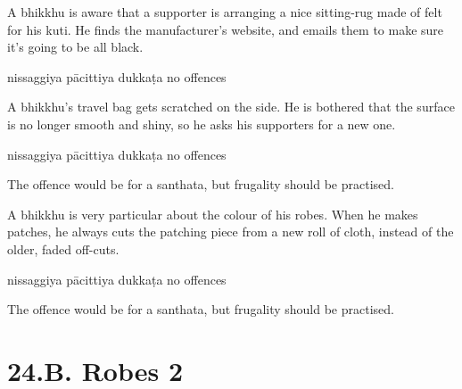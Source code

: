 \begin{exam}{\autoExamName}
\begin{problem*}
\begin{parts}
      \bigskip

      \item A bhikkhu is aware that a supporter is arranging a nice sitting-rug
      made of felt for his kuti. He finds the manufacturer's website, and emails
      them to make sure it's going to be all black.

      \bigskip

      \begin{answers}{3}
        \bChoices
         nissaggiya pācittiya\eAns
         dukkaṭa\eAns
         no offences\eAns
        \eChoices
      \end{answers}

      \bigskip

      \item A bhikkhu's travel bag gets scratched on the side. He is bothered
      that the surface is no longer smooth and shiny, so he asks his supporters
      for a new one.

      \bigskip

      \begin{answers}{3}
        \bChoices
         nissaggiya pācittiya\eAns
         dukkaṭa\eAns
         no offences\eAns
        \eChoices
      \end{answers}

      \begin{solution}
        The offence would be for a santhata, but frugality should be practised.
      \end{solution}

      \bigskip

      \item A bhikkhu is very particular about the colour of his robes. When he
      makes patches, he always cuts the patching piece from a new roll of cloth,
      instead of the older, faded off-cuts.

      \bigskip

      \begin{answers}{3}
        \bChoices
         nissaggiya pācittiya\eAns
         dukkaṭa\eAns
         no offences\eAns
        \eChoices
      \end{answers}

      \begin{solution}
        The offence would be for a santhata, but frugality should be practised.
      \end{solution}

    \end{parts}

  \end{problem*}

\end{exam}

\chapter{24.B. Robes 2}
\renewcommand*{\theChapterTitle}{24.B. Robes 2}
